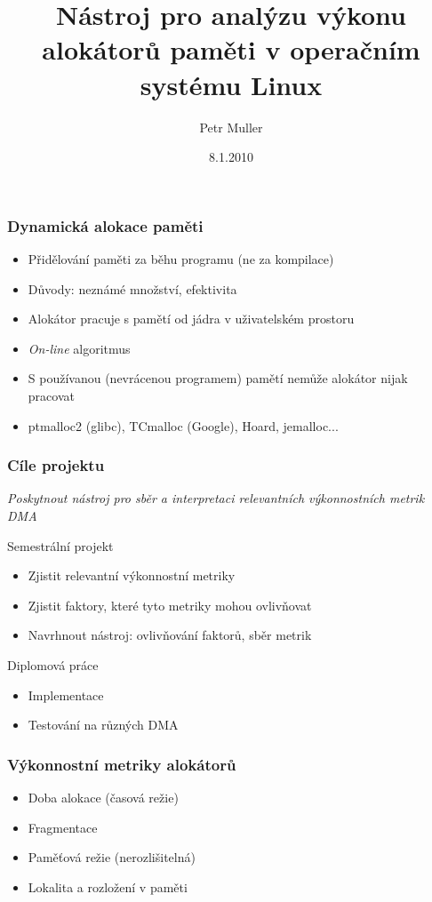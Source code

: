 \documentclass{beamer}
\author{Petr Muller}
\title{Nástroj pro analýzu výkonu alokátorů paměti v operačním systému Linux}
\date{8.1.2010}
\begin{document}
\begin{frame}
\titlepage
\end{frame}

\begin{frame}
\frametitle{Dynamická alokace paměti}
\begin{itemize}
  \item Přidělování paměti za běhu programu (ne za kompilace)
  \item Důvody: neznámé množství, efektivita
  \item Alokátor pracuje s pamětí od jádra v uživatelském prostoru
  \item {\em On-line} algoritmus
  \item S používanou (nevrácenou programem) pamětí nemůže alokátor nijak pracovat
  \item ptmalloc2 (glibc), TCmalloc (Google), Hoard, jemalloc...
\end{itemize}
\end{frame}

\begin{frame}
\frametitle{Cíle projektu}
{\em Poskytnout nástroj pro sběr a interpretaci relevantních výkonnostních metrik DMA}
\begin{block}{Semestrální projekt}
\begin{itemize}
  \item Zjistit relevantní výkonnostní metriky
  \item Zjistit faktory, které tyto metriky mohou ovlivňovat
  \item Navrhnout nástroj: ovlivňování faktorů, sběr metrik
\end{itemize}
\end{block}
\begin{block}{Diplomová práce}
\begin{itemize}
  \item Implementace
  \item Testování na různých DMA
\end{itemize}
\end{block}
\end{frame}

\begin{frame}
\frametitle{Výkonnostní metriky alokátorů}
\begin{itemize}
  \item Doba alokace (časová režie)
  \item Fragmentace
  \item Paměťová režie (nerozlišitelná)
  \item Lokalita a rozložení v paměti
\end{itemize}
\end{frame}
\end{document}
